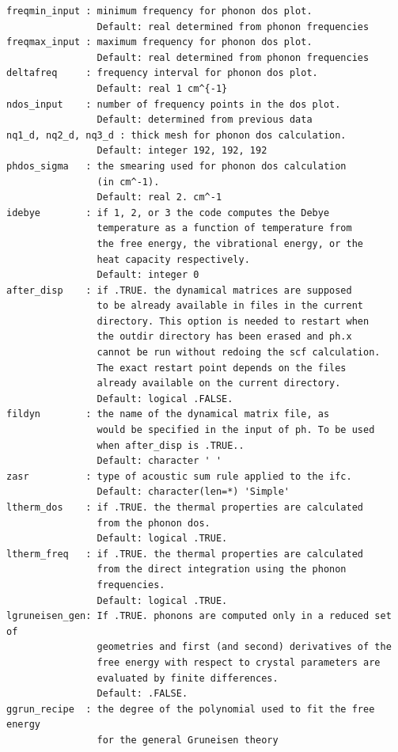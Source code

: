 \documentclass[12pt,a4paper,twoside]{report}
\begin{document}
\begin{verbatim}
freqmin_input : minimum frequency for phonon dos plot.
                Default: real determined from phonon frequencies
freqmax_input : maximum frequency for phonon dos plot.
                Default: real determined from phonon frequencies
deltafreq     : frequency interval for phonon dos plot.
                Default: real 1 cm^{-1}
ndos_input    : number of frequency points in the dos plot.
                Default: determined from previous data
nq1_d, nq2_d, nq3_d : thick mesh for phonon dos calculation.
                Default: integer 192, 192, 192
phdos_sigma   : the smearing used for phonon dos calculation 
                (in cm^-1).
                Default: real 2. cm^-1
idebye        : if 1, 2, or 3 the code computes the Debye 
                temperature as a function of temperature from 
                the free energy, the vibrational energy, or the 
                heat capacity respectively.
                Default: integer 0
after_disp    : if .TRUE. the dynamical matrices are supposed 
                to be already available in files in the current 
                directory. This option is needed to restart when 
                the outdir directory has been erased and ph.x 
                cannot be run without redoing the scf calculation. 
                The exact restart point depends on the files 
                already available on the current directory.
                Default: logical .FALSE.
fildyn        : the name of the dynamical matrix file, as 
                would be specified in the input of ph. To be used 
                when after_disp is .TRUE.. 
                Default: character ' '
zasr          : type of acoustic sum rule applied to the ifc.
                Default: character(len=*) 'Simple'
ltherm_dos    : if .TRUE. the thermal properties are calculated 
                from the phonon dos.
                Default: logical .TRUE.
ltherm_freq   : if .TRUE. the thermal properties are calculated 
                from the direct integration using the phonon 
                frequencies.
                Default: logical .TRUE.
lgruneisen_gen: If .TRUE. phonons are computed only in a reduced set of
                geometries and first (and second) derivatives of the
                free energy with respect to crystal parameters are
                evaluated by finite differences.
                Default: .FALSE.
ggrun_recipe  : the degree of the polynomial used to fit the free energy
                for the general Gruneisen theory

\end{verbatim}
\end{document}

